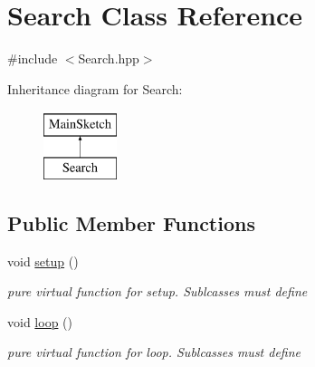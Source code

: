 \hypertarget{classSearch}{\section{Search Class Reference}
\label{classSearch}
}


{\ttfamily \#include $<$Search.\-hpp$>$}

Inheritance diagram for Search\-:\begin{figure}[H]
\begin{center}
\leavevmode
\includegraphics[height=2.000000cm]{classSearch}
\end{center}
\end{figure}
\subsection*{Public Member Functions}
\begin{DoxyCompactItemize}
\item 
void \hyperlink{classSearch_ad5de8c844478b7f0903d724236fd12ad}{setup} ()
\begin{DoxyCompactList}\small\item\em pure virtual function for setup. Sublcasses must define \end{DoxyCompactList}\item 
void \hyperlink{classSearch_a75f9358f4551ee9ed0d750eac8fd479e}{loop} ()
\begin{DoxyCompactList}\small\item\em pure virtual function for loop. Sublcasses must define \end{DoxyCompactList}\end{DoxyCompactItemize}

